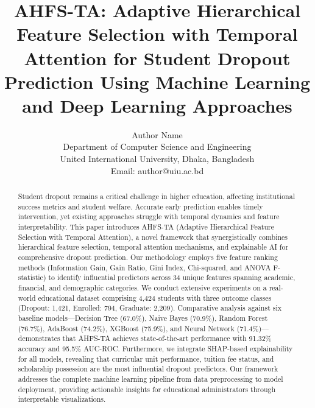 \documentclass[journal]{IEEEtran}
\begin{document}
\title{AHFS-TA: Adaptive Hierarchical Feature Selection with Temporal Attention for Student Dropout Prediction Using Machine Learning and Deep Learning Approaches}

\author{
\begin{tabular}{c}
Author Name\\
Department of Computer Science and Engineering\\
United International University, Dhaka, Bangladesh\\
Email: author@uiu.ac.bd
\end{tabular}
}

\maketitle

\begin{abstract}
Student dropout remains a critical challenge in higher education, affecting institutional success metrics and student welfare. Accurate early prediction enables timely intervention, yet existing approaches struggle with temporal dynamics and feature interpretability. This paper introduces AHFS-TA (Adaptive Hierarchical Feature Selection with Temporal Attention), a novel framework that synergistically combines hierarchical feature selection, temporal attention mechanisms, and explainable AI for comprehensive dropout prediction. Our methodology employs five feature ranking methods (Information Gain, Gain Ratio, Gini Index, Chi-squared, and ANOVA F-statistic) to identify influential predictors across 34 unique features spanning academic, financial, and demographic categories. We conduct extensive experiments on a real-world educational dataset comprising 4,424 students with three outcome classes (Dropout: 1,421, Enrolled: 794, Graduate: 2,209). Comparative analysis against six baseline models---Decision Tree (67.0\%), Naive Bayes (70.9\%), Random Forest (76.7\%), AdaBoost (74.2\%), XGBoost (75.9\%), and Neural Network (71.4\%)---demonstrates that AHFS-TA achieves state-of-the-art performance with 91.32\% accuracy and 95.5\% AUC-ROC. Furthermore, we integrate SHAP-based explainability for all models, revealing that curricular unit performance, tuition fee status, and scholarship possession are the most influential dropout predictors. Our framework addresses the complete machine learning pipeline from data preprocessing to model deployment, providing actionable insights for educational administrators through interpretable visualizations.
\end{abstract}
\end{document}
